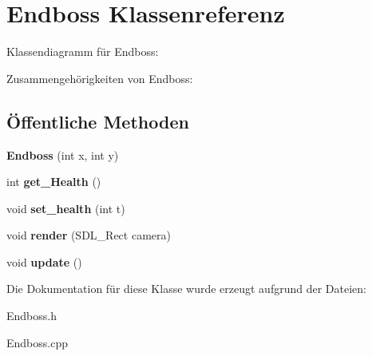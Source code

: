 \hypertarget{class_endboss}{\section{Endboss Klassenreferenz}
\label{class_endboss}
}


Klassendiagramm für Endboss\-:


Zusammengehörigkeiten von Endboss\-:
\subsection*{Öffentliche Methoden}
\begin{DoxyCompactItemize}
\item 
\hypertarget{class_endboss_a6d553673da1e7b3d09ce54cd2503cbb7}{{\bfseries Endboss} (int x, int y)}\label{class_endboss_a6d553673da1e7b3d09ce54cd2503cbb7}

\item 
\hypertarget{class_endboss_a69ae2922f0f6647037926e917da4ee5e}{int {\bfseries get\-\_\-\-Health} ()}\label{class_endboss_a69ae2922f0f6647037926e917da4ee5e}

\item 
\hypertarget{class_endboss_a0bbf59647d911c6380246de92b5f5e21}{void {\bfseries set\-\_\-health} (int t)}\label{class_endboss_a0bbf59647d911c6380246de92b5f5e21}

\item 
\hypertarget{class_endboss_a17b150268f358172b140a984aaaa61c8}{void {\bfseries render} (S\-D\-L\-\_\-\-Rect camera)}\label{class_endboss_a17b150268f358172b140a984aaaa61c8}

\item 
\hypertarget{class_endboss_a7a56e4b087239ff73b7810c967e3858f}{void {\bfseries update} ()}\label{class_endboss_a7a56e4b087239ff73b7810c967e3858f}

\end{DoxyCompactItemize}


Die Dokumentation für diese Klasse wurde erzeugt aufgrund der Dateien\-:\begin{DoxyCompactItemize}
\item 
Endboss.\-h\item 
Endboss.\-cpp\end{DoxyCompactItemize}
